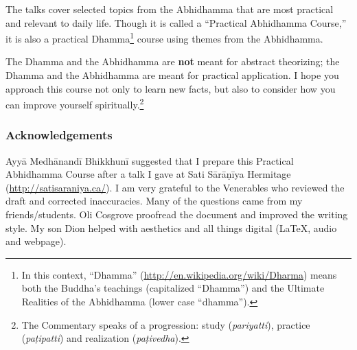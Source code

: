 The talks cover selected topics from the Abhidhamma that are most practical and relevant to daily life. Though it is called a “Practical Abhidhamma Course,” it is also a practical Dhamma\footnote{In this context, “Dhamma” (\url{http://en.wikipedia.org/wiki/Dharma}) means both the Buddha’s teachings (capitalized “Dhamma”) and the Ultimate Realities of the Abhidhamma (lower case “dhamma”).} course using themes from the Abhidhamma.

The Dhamma and the Abhidhamma are \textbf{not} meant for abstract theorizing; the Dhamma and the Abhidhamma are meant for practical application. I hope you approach this course not only to learn new facts, but also to consider how you can improve yourself spiritually.\footnote{The Commentary speaks of a progression: study (\textit{pariyatti}), practice (\textit{paṭipatti}) and realization (\textit{paṭivedha}).}

\subsubsection*{Acknowledgements}

Ayyā Medhānandī Bhikkhunī suggested that I prepare this Practical Abhidhamma Course after a talk I gave at Sati Sārāṇīya Hermitage (\url{http://satisaraniya.ca/}). I am very grateful to the Venerables who reviewed the draft and corrected inaccuracies. Many of the questions came from my friends/students. Oli Cosgrove proofread the document and improved the writing style. My son Dion helped with aesthetics and all things digital (\LaTeX, audio and webpage).
